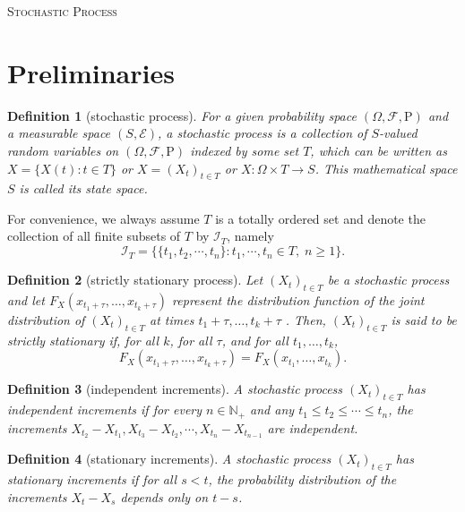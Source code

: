 \documentclass{article}
\newtheorem{definition}{Definition}[section]
\theoremstyle{nonumberplain}
\begin{document}
	\begin{center}
	\textsc{\Huge Stochastic Process}	
\end{center}
\vspace{1em} 

\section{Preliminaries}
\begin{definition}[stochastic process]
For a given probability space $(\Omega ,{\mathcal{F}},\mathrm{P})$ and a measurable space $(S,\mathcal{E})$, a \emph{stochastic process} is a collection of $S$-valued random variables on $(\Omega ,{\mathcal{F}},\mathrm{P})$ indexed by some set $T$, which can be written as $X=\{X(t):t\in T\}$ or $X=(X_t)_{t\in T}$ or $X:\Omega \times T\rightarrow S$. This mathematical space $S$ is called its state space. 
\end{definition}

\noindent For convenience, we always assume $T$ is a totally ordered set and denote the collection of all finite subsets of $T$ by $\mathcal{I}_T$, namely
\[
\mathcal{I}_T=\{\{t_1,t_2,\cdots,t_n\}:t_1,\cdots,t_n\in T,\;n\ge 1\}.
\]

\begin{definition}[strictly stationary process]
	Let $(X_t)_{t\in T}$ be a stochastic process and let \newline $F_{{X}}(x_{{t_{1}+\tau }},\ldots ,x_{{t_{k}+\tau }})$ represent the  distribution function of the joint distribution of $(X_t)_{t\in T}$ at times $t_{1}+\tau ,\ldots ,t_{k}+\tau$ . Then, $(X_t)_{t\in T}$ is said to be strictly stationary if, for all $k$, for all $\tau$, and for all $ t_{1},\ldots ,t_{k}$,
	\[
	F_{{X}}(x_{{t_{1}+\tau }},\ldots ,x_{{t_{k}+\tau }})=F_{{X}}(x_{{t_{1}}},\ldots ,x_{{t_{k}}}).
	\]
\end{definition}

\begin{definition}[independent increments]
	A stochastic process $(X_t)_{t\in T}$ has \emph{independent increments} if for every $n\in \mathbb{N}_+$ and any $t_1\le t_2 \le\cdots\le t_n$, the increments $X_{t_2}-X_{t_1},X_{t_3}-X_{t_2},\cdots,X_{t_n}-X_{t_{n-1}}$ are independent.
\end{definition}

\begin{definition}[stationary increments]
	A stochastic process $(X_t)_{t\in T}$ has \emph{stationary increments} if for all $s<t$, the probability distribution of the increments $X_{t}-X_{s}$ depends only on $t-s$.
\end{definition}
\end{document}
